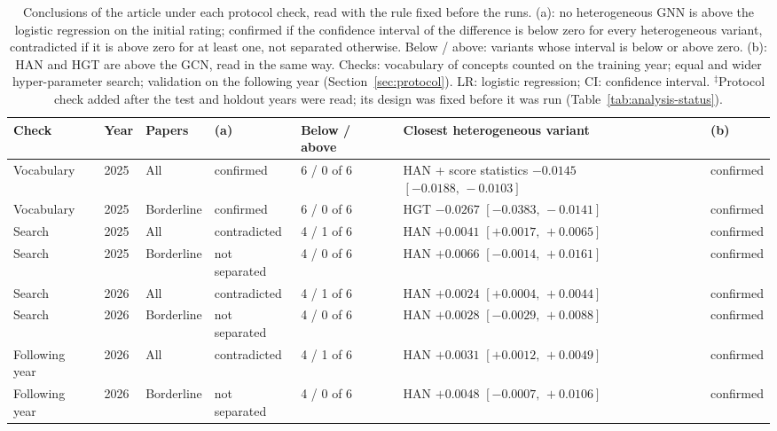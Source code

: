\begin{table}[t]
\centering
\footnotesize
\setlength{\tabcolsep}{2.5pt}
\caption{Conclusions of the article under each protocol check, read with the rule fixed before the runs. (a): no heterogeneous GNN is above the logistic regression on the initial rating; confirmed if the confidence interval of the difference is below zero for every heterogeneous variant, contradicted if it is above zero for at least one, not separated otherwise. Below / above: variants whose interval is below or above zero. (b): HAN and HGT are above the GCN, read in the same way. Checks: vocabulary of concepts counted on the training year; equal and wider hyper-parameter search; validation on the following year (Section~\ref{sec:protocol}). LR: logistic regression; CI: confidence interval. $^{\ddagger}$Protocol check added after the test and holdout years were read; its design was fixed before it was run (Table~\ref{tab:analysis-status}).}
\label{tab:protocol-readings}
\begin{tabular}{@{}lllllll@{}}
\toprule
Check & Year & Papers & (a) & Below / above & Closest heterogeneous variant & (b) \\
\midrule
Vocabulary & 2025 & All & confirmed & 6 / 0 of 6 & HAN + score statistics $-0.0145$ $[-0.0188,\,-0.0103]$ & confirmed \\
Vocabulary & 2025 & Borderline & confirmed & 6 / 0 of 6 & HGT $-0.0267$ $[-0.0383,\,-0.0141]$ & confirmed \\
Search & 2025 & All & contradicted & 4 / 1 of 6 & HAN $+0.0041$ $[+0.0017,\,+0.0065]$ & confirmed \\
Search & 2025 & Borderline & not separated & 4 / 0 of 6 & HAN $+0.0066$ $[-0.0014,\,+0.0161]$ & confirmed \\
Search & 2026 & All & contradicted & 4 / 1 of 6 & HAN $+0.0024$ $[+0.0004,\,+0.0044]$ & confirmed \\
Search & 2026 & Borderline & not separated & 4 / 0 of 6 & HAN $+0.0028$ $[-0.0029,\,+0.0088]$ & confirmed \\
Following year & 2026 & All & contradicted & 4 / 1 of 6 & HAN $+0.0031$ $[+0.0012,\,+0.0049]$ & confirmed \\
Following year & 2026 & Borderline & not separated & 4 / 0 of 6 & HAN $+0.0048$ $[-0.0007,\,+0.0106]$ & confirmed \\
\bottomrule
\end{tabular}
\end{table}
